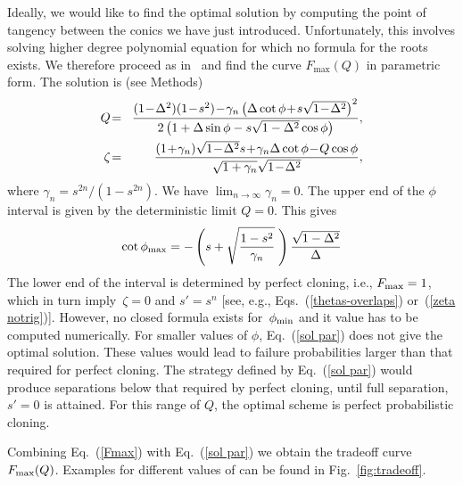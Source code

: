 \documentclass[aps,pra,twocolumn,showpacs]{revtex4-1}
\begin{document}
Ideally, we would like to find the optimal solution by computing the point of tangency between the conics we have just introduced. Unfortunately, this involves solving higher degree polynomial equation for which no formula for the roots exists. We therefore proceed as in~\cite{us2} and find the curve $F_{\max}(Q)$ in parametric form. The solution is (see Methods)
%
\begin{eqnarray}
Q\!&=&\!{(1\!-\!\Delta^2)(1\!-\!s^2)\!-\!\gamma_n\left(\Delta\cot\phi\!+\!s\sqrt{1\!-\!\Delta^2}\right)^2\over2\left(1+\Delta\sin\phi-s\sqrt{1-\Delta^2}\cos\phi\right)},
\nonumber\\
\zeta \!&=&\!{(1\!+\!\gamma_n)\sqrt{1\!-\!\Delta^2}s\!+\!\gamma_n\Delta\cot\phi\!-\!Q\cos\phi\over\sqrt{1+\gamma_n}\sqrt{1\!-\!\Delta^2}},
\label{sol par}
\end{eqnarray}
%
where $\gamma_n=s^{2n}/(1-s^{2n})$. We have $\lim_{n\to\infty}\gamma_n=0$. The upper end of the $\phi$ interval is given by the deterministic limit $Q=0$. This gives 
%
\begin{equation}
\cot\phi_{\rm max}=-\left(s+\sqrt{{1-s^2\over \gamma_n}}\;\right){\sqrt{1-\Delta^2}\over\Delta}
\end{equation}
%
The lower end of the interval is determined by perfect cloning, i.e., $F_{\rm max}=1$, which in turn imply~$\zeta=0$ and $s'=s^n$ [see, e.g., Eqs.~(\ref{thetas-overlaps}) or~(\ref{zeta notrig})]. However, no closed formula exists for~$\phi_{\rm min}$ and it value has to be computed numerically.  For smaller values of $\phi$, Eq.~(\ref{sol par}) does not give the optimal solution. These values would lead to failure probabilities larger than that required for perfect cloning. The strategy defined by Eq.~(\ref{sol par}) would produce separations below that required by perfect cloning, until full separation, $s'=0$ is attained. For this range of $Q$, the optimal scheme is perfect probabilistic cloning.

Combining Eq.~(\ref{Fmax}) with Eq.~(\ref{sol par}) we obtain the tradeoff curve $F_{\rm max}(Q)$. Examples for different values of can be found in Fig.~\ref{fig:tradeoff}.
\end{document}
